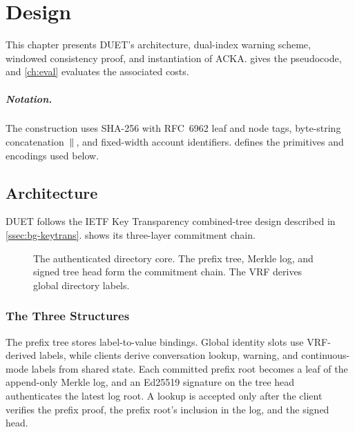 \chapter{Design}\label{ch:design}

This chapter presents DUET's architecture, dual-index warning scheme, windowed consistency proof, and
instantiation of ACKA.  gives the pseudocode, and \cref{ch:eval} evaluates the
associated costs.

\paragraph{Notation.} The construction uses SHA-256 with RFC~6962 leaf and node tags, byte-string
concatenation $\,\|\,$, and fixed-width account identifiers. 
defines the primitives and encodings used below.

\section{Architecture}\label{sec:design-arch}

DUET follows the IETF Key Transparency combined-tree design described in
\cref{ssec:bg-keytrans}.  shows its three-layer commitment chain.

\begin{figure}[t]
\centering

\caption[The authenticated directory core.]{The authenticated directory core. The prefix tree,
Merkle log, and signed tree head form the commitment chain. The VRF derives global directory
labels.}
\label{fig:design-arch}
\end{figure}

\subsection{The Three Structures}\label{ssec:design-structures}

The prefix tree stores label-to-value bindings. Global identity slots use VRF-derived labels, while
clients derive conversation lookup, warning, and continuous-mode labels from shared state. Each
committed prefix root becomes a leaf of the append-only Merkle log, and an Ed25519 signature on the
tree head authenticates the latest log root. A lookup is accepted only after the client verifies the
prefix proof, the prefix root's inclusion in the log, and the signed head.

